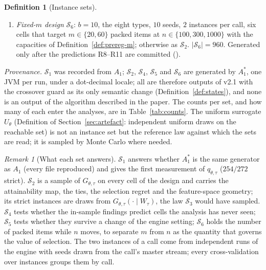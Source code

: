 \documentclass[a4paper,11pt]{article}
\newcommand{\code}[1]{\path{#1}}
\newcommand{\Aone}{A_{1}}
\newcommand{\Astar}{A_{1}^{*}}
\newcommand{\Utheta}{U_{\theta}}
\newcommand{\Gtt}{G_{\theta,\tau}}
\theoremstyle{plain}
\theoremstyle{definition}
\newtheorem{definition}{Definition}
\theoremstyle{remark}
\newtheorem{remark}{Remark}
\begin{document}
\begin{definition}[Instance sets]
\begin{enumerate}[leftmargin=1.8em,itemsep=2pt]
refers to $\mathcal S_4$.
\item \emph{Fixed-$m$ design} $\mathcal S_6$: $b=10$, the eight types, $10$ seeds, $2$
instances per call, six cells that target $m\in\{20,60\}$ packed items at
$n\in\{100,300,1000\}$ with the capacities of Definition~\ref{def:prereg-m}; otherwise as
$\mathcal S_2$. $|\mathcal S_6|=960$. Generated only after the predictions R8--R11 are
committed (\code{3e199a4}).
\end{enumerate}
\emph{Provenance.} $\mathcal S_1$ was recorded from $\Aone$; $\mathcal S_2$, $\mathcal S_4$,
$\mathcal S_5$ and $\mathcal S_6$ are generated by $\Astar$, one JVM per run, under a dot-decimal locale; all are therefore
outputs of v2.1 with the crossover guard as its only semantic change
(Definition~\ref{def:states}), and none is an output of the algorithm described in the paper.
The counts per set, and how many of each enter the analyses, are in Table~\ref{tab:counts}.
The uniform surrogate $\Utheta$ (Definition of Section~\ref{sec:artefact}: independent
uniform draws on the reachable set) is not an instance set but the reference law against
which the sets are read; it is sampled by Monte Carlo where needed.
\end{definition}

\begin{remark}[What each set answers]
$\mathcal S_1$ answers whether $\Astar$ is the same generator as $\Aone$ (every file
reproduced) and gives the first measurement of $q_{\theta,\tau}$ ($254/272$ strict).
$\mathcal S_2$ is a sample of $\Gtt$ on every cell of the design and carries the
attainability map, the ties, the selection regret and the feature-space geometry; its strict
instances are draws from $\Gtt(\cdot\mid W_\tau)$, the law $\mathcal S_3$ would have sampled.
$\mathcal S_4$ tests whether the
in-sample findings predict cells the analysis has never seen; $\mathcal S_5$ tests whether
they survive a change of the engine setting; $\mathcal S_6$ holds the number of packed items
while $n$ moves, to separate $m$ from $n$ as the quantity that governs the value of selection. The two instances of a call come from
independent runs of the engine with seeds drawn from the call's master stream; every
cross-validation over instances groups them by call.
\end{remark}
\end{document}
